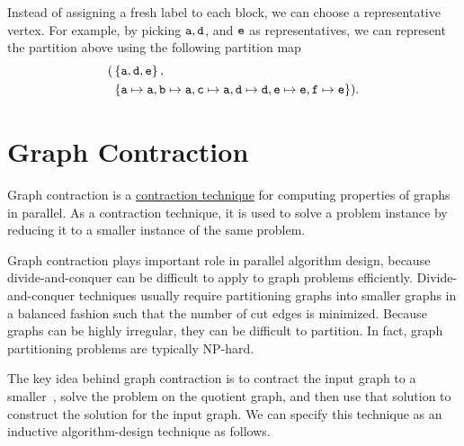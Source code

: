 \begin{flex}
\begin{example}
Instead of assigning a fresh label to each block, we can choose a
representative vertex.
%
For example, by picking $\texttt{a}, \texttt{d}$, and $\texttt{e}$ as
representatives, we can represent the partition above using the
following partition map
\begin{alignat}{1}
( & \left\{ \texttt{a},\texttt{d},\texttt{e} \right\}, 
\\
       & \left\{ \texttt{a} \mapsto \texttt{a}, \texttt{b} \mapsto \texttt{a}, 
               \texttt{c} \mapsto \texttt{a}, \texttt{d} \mapsto \texttt{d}, 
               \texttt{e} \mapsto \texttt{e}, \texttt{f} \mapsto
               \texttt{e} \right\}
).
\end{alignat}

\end{example}
\end{flex}

\section{Graph Contraction}
\label{ex:graphcon::intro::graphcon}

Graph contraction is a 
%
\href{ch:design::contraction}{contraction technique}
%
for computing properties of graphs in parallel.
%
As a contraction technique, it is used to solve a problem
instance by reducing it to a smaller instance of the same problem.
%
%

Graph contraction plays important role in parallel algorithm design, because
divide-and-conquer can be difficult to apply to graph problems
efficiently.  
%
Divide-and-conquer techniques usually require partitioning graphs into
smaller graphs in a balanced fashion such that the number of cut edges
is minimized.  
%
Because graphs can be highly irregular, they can be difficult
to partition. 
%
In fact, graph partitioning problems are typically
NP-hard.
%

\begin{gram}
\label{graphcon::intro::graphcon::quotient}
The key idea behind graph contraction is to contract the input graph
to a smaller~, solve the problem on the quotient
graph, and then use that solution to construct the solution for the
input graph.  
%
We can specify this technique as an inductive algorithm-design
technique as follows.
\end{gram}

